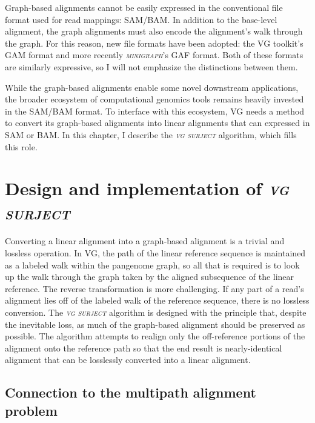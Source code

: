 \documentclass[11pt]{ucthesis}
\newcommand{\tool}[1]{\emph{\textsc{#1}}}
\begin{document}
Graph-based alignments cannot be easily expressed in the conventional file format used for read mappings: SAM/BAM\cite{li2009sequence}. In addition to the base-level alignment, the graph alignments must also encode the alignment's walk through the graph. For this reason, new file formats have been adopted: the VG toolkit's GAM format and more recently \tool{minigraph}'s GAF format\cite{li2020design}. Both of these formats are similarly expressive, so I will not emphasize the distinctions between them. 

While the graph-based alignments enable some novel downstream applications\cite{hickey2020genotyping,rautiainen2020graphaligner}, the broader ecosystem of computational genomics tools remains heavily invested in the SAM/BAM format. To interface with this ecosystem, VG needs a method to convert its graph-based alignments into linear alignments that can expressed in SAM or BAM. In this chapter, I describe the \tool{vg surject} algorithm, which fills this role.

\section{Design and implementation of \tool{vg surject}}

Converting a linear alignment into a graph-based alignment is a trivial and lossless operation. In VG, the path of the linear reference sequence is maintained as a labeled walk within the pangenome graph, so all that is required is to look up the walk through the graph taken by the aligned subsequence of the linear reference. The reverse transformation is more challenging. If any part of a read's alignment lies off of the labeled walk of the reference sequence, there is no lossless conversion. The \tool{vg surject} algorithm is designed with the principle that, despite the inevitable loss, as much of the graph-based alignment should be preserved as possible. The algorithm attempts to realign only the off-reference portions of the alignment onto the reference path so that the end result is nearly-identical alignment that can be losslessly converted into a linear alignment.

\subsection{Connection to the multipath alignment problem}
\end{document}
